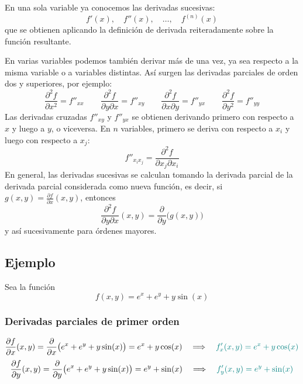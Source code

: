 \documentclass{article}
\begin{document}
En una sola variable ya conocemos las derivadas sucesivas:
\[
f'(x),\quad f''(x),\quad \dots,\quad f^{(n)}(x)
\]
que se obtienen aplicando la definición de derivada reiteradamente sobre la función resultante.

En varias variables podemos también derivar más de una vez, ya sea respecto a la misma variable o a variables distintas. Así surgen las derivadas parciales de orden dos y superiores, por ejemplo:
\[
\frac{\partial^{2}f}{\partial x^{2}}=f''_{xx}
\qquad
\frac{\partial^{2}f}{\partial y \partial x}=f''_{xy}
\qquad
\frac{\partial^{2}f}{\partial x\partial y}=f''_{yx}
\qquad
\frac{\partial^{2}f}{\partial y^{2}}=f''_{yy}
\]
Las derivadas cruzadas \(f''_{xy}\) y \(f''_{yx}\) se obtienen derivando primero con respecto a \(x\) y luego a \(y\), o viceversa. En \(n\) variables, primero se deriva con respecto a \(x_i\) y luego con respecto a \(x_j\):
\[
f''_{x_ix_j}=\frac{\partial^{2}f}{\partial x_j\partial x_i}
\]
En general, las derivadas sucesivas se calculan tomando la derivada parcial de la derivada parcial considerada como nueva función, es decir, si \(g(x,y)=\frac{\partial f}{\partial x}(x,y)\), entonces
\[
\frac{\partial^{2}f}{\partial y\partial x }(x,y)
=\frac{\partial}{\partial y}\bigl(g(x,y)\bigr)
\]
y así sucesivamente para órdenes mayores.


\subsection*{Ejemplo}

Sea la función
\[
f(x,y)=e^{x} + e^{y} + y\sin(x)
\]


\subsubsection*{Derivadas parciales de primer orden}
\[
\frac{\partial f}{\partial x}(x,y)
=\frac{\partial}{\partial x}\bigl(e^{x} + e^{y} + y\sin(x)\bigr)
=e^{x} + y\cos(x)
\quad\Longrightarrow\quad
\color{teal}
f'_x(x,y)=e^{x}+y\cos(x)
\]
\[
\frac{\partial f}{\partial y}(x,y)
=\frac{\partial}{\partial y}\bigl(e^{x} + e^{y} + y\sin(x)\bigr)
=e^{y} + \sin(x)
\quad\Longrightarrow\quad
\color{teal}
f'_y(x,y)=e^{y}+\sin(x)
\]
\end{document}
